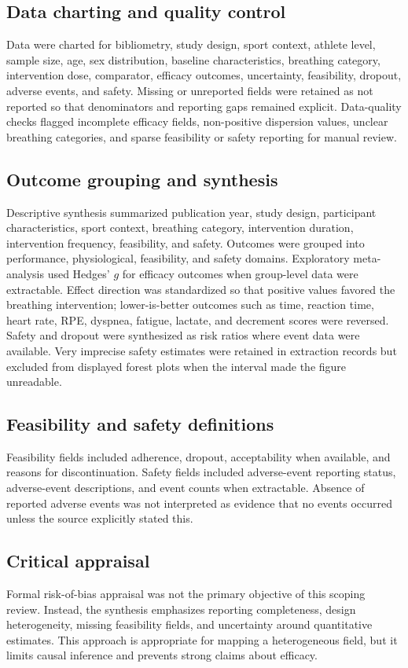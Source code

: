 \documentclass[12pt,a4paper]{article}
\begin{document}
\subsection{Data charting and quality control}
Data were charted for bibliometry, study design, sport context, athlete level, sample size, age, sex distribution, baseline characteristics, breathing category, intervention dose, comparator, efficacy outcomes, uncertainty, feasibility, dropout, adverse events, and safety. Missing or unreported fields were retained as not reported so that denominators and reporting gaps remained explicit. Data-quality checks flagged incomplete efficacy fields, non-positive dispersion values, unclear breathing categories, and sparse feasibility or safety reporting for manual review.

\subsection{Outcome grouping and synthesis}
Descriptive synthesis summarized publication year, study design, participant characteristics, sport context, breathing category, intervention duration, intervention frequency, feasibility, and safety. Outcomes were grouped into performance, physiological, feasibility, and safety domains. Exploratory meta-analysis used Hedges' $g$ for efficacy outcomes when group-level data were extractable. Effect direction was standardized so that positive values favored the breathing intervention; lower-is-better outcomes such as time, reaction time, heart rate, RPE, dyspnea, fatigue, lactate, and decrement scores were reversed. Safety and dropout were synthesized as risk ratios where event data were available. Very imprecise safety estimates were retained in extraction records but excluded from displayed forest plots when the interval made the figure unreadable.

\subsection{Feasibility and safety definitions}
Feasibility fields included adherence, dropout, acceptability when available, and reasons for discontinuation. Safety fields included adverse-event reporting status, adverse-event descriptions, and event counts when extractable. Absence of reported adverse events was not interpreted as evidence that no events occurred unless the source explicitly stated this.

\subsection{Critical appraisal}
Formal risk-of-bias appraisal was not the primary objective of this scoping review. Instead, the synthesis emphasizes reporting completeness, design heterogeneity, missing feasibility fields, and uncertainty around quantitative estimates. This approach is appropriate for mapping a heterogeneous field, but it limits causal inference and prevents strong claims about efficacy.
\end{document}
